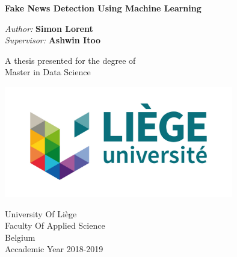 \documentclass[12pt,a4paper,oneside]{book}
\begin{document}
\begin{titlepage}
    \begin{center}
        \vspace*{1cm}
 
        \Huge
        \textbf{Fake News Detection Using Machine Learning }
 
        \vspace{0.5cm}
        \LARGE
        
 
        \vspace{1.5cm}
 
        \textit{Author:} \textbf{Simon Lorent}\\
        \textit{Supervisor:} \textbf{Ashwin Itoo}
 
        \vfill
 
        A thesis presented for the degree of\\
        Master in Data Science
 
        \vspace{0.8cm}
 
        \includegraphics[width=0.75\textwidth]{uliege-logo-couleurs-300}
 
        \Large
        University Of Li\`ege\\
        Faculty Of Applied Science\\
        Belgium\\
        Accademic Year 2018-2019
 
    \end{center}
\end{titlepage}

\tableofcontents











\appendix
	

\end{document}
